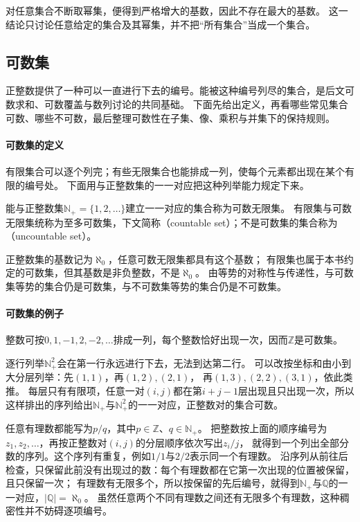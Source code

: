 对任意集合不断取幂集，便得到严格增大的基数，因此不存在最大的基数。
这一结论只讨论任意给定的集合及其幂集，并不把“所有集合”当成一个集合。

\subsection{可数集}
\label{sec:comb-countable-sets}

正整数提供了一种可以一直进行下去的编号。能被这种编号列尽的集合，是后文可数求和、可数覆盖与数列讨论的共同基础。
下面先给出定义，再看哪些常见集合可数、哪些不可数，最后整理可数性在子集、像、乘积与并集下的保持规则。

\paragraph{可数集的定义}

有限集合可以逐个列完；有些无限集合也能排成一列，使每个元素都出现在某个有限的编号处。
下面用与正整数集的一一对应把这种列举能力规定下来。
\begin{definition}[可数集]
\label{def:analysis-countable-set}
能与正整数集$\mathbb N_+=\{1,2,\ldots\}$建立一一对应的集合称为可数无限集。
有限集与可数无限集统称为至多可数集，下文简称（countable set）；不是可数集的集合称为（uncountable set）。
\end{definition}

正整数集的基数记为$\aleph_0$，任意可数无限集都具有这个基数；
有限集也属于本书约定的可数集，但其基数是非负整数，不是$\aleph_0$。
由等势的对称性与传递性，与可数集等势的集合仍是可数集，与不可数集等势的集合仍是不可数集。

\paragraph{可数集的例子}

整数可按$0,1,-1,2,-2,\ldots$排成一列，每个整数恰好出现一次，因而$\mathbb Z$是可数集。

逐行列举$\mathbb N_+^2$会在第一行永远进行下去，无法到达第二行。
可以改按坐标和由小到大分层列举：先$(1,1)$，再$(1,2),(2,1)$，
再$(1,3),(2,2),(3,1)$，依此类推。
每层只有有限项，任意一对$(i,j)$都在第$i+j-1$层出现且只出现一次，所以这样排出的序列给出$\mathbb N_+$与$\mathbb N_+^2$的一一对应，正整数对的集合可数。

任意有理数都能写为$p/q$，其中$p\in\mathbb Z$、$q\in\mathbb N_+$。
把整数按上面的顺序编号为$z_1,z_2,\ldots$，再按正整数对$(i,j)$的分层顺序依次写出$z_i/j$，
就得到一个列出全部分数的序列。这个序列有重复，例如$1/1$与$2/2$表示同一个有理数。
沿序列从前往后检查，只保留此前没有出现过的数：每个有理数都在它第一次出现的位置被保留，且只保留一次；
有理数有无限多个，所以按保留的先后编号，就得到$\mathbb N_+$与$\mathbb Q$的一一对应，$|\mathbb Q|=\aleph_0$。
虽然任意两个不同有理数之间还有无限多个有理数，这种稠密性并不妨碍逐项编号。

